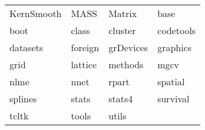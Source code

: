 \begin{tabular}{llll} 
KernSmooth & MASS & Matrix & base\\ 
boot & class & cluster & codetools\\ 
datasets & foreign & grDevices & graphics\\ 
grid & lattice & methods & mgcv\\ 
nlme & nnet & rpart & spatial\\ 
splines & stats & stats4 & survival\\ 
tcltk & tools & utils  \\ 
\end{tabular}
